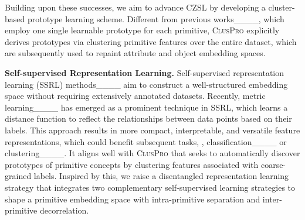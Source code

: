 Building upon these successes, we aim to advance CZSL by developing a cluster-based prototype learning scheme. 
Different from previous works____, which employ one single learnable prototype for each primitive, \textsc{ClusPro} explicitly derives prototypes via clustering primitive features over the entire dataset, which are subsequently used to repaint attribute and object embedding spaces.

\noindent\textbf{Self-supervised Representation Learning.} 
Self-supervised representation learning (SSRL) methods____ aim to construct a well-structured embedding space without requiring extensively annotated datasets.
Recently, metric learning____ has emerged as a prominent technique in SSRL, which learns a distance function to reflect the relationships between data points based on their labels.
This approach results in more compact, interpretable, and versatile feature representations, which could benefit subsequent tasks, \eg, classification____ or clustering____.
It aligns well with \textsc{ClusPro} that seeks to automatically discover prototypes of primitive concepts by clustering features associated with coarse-grained labels.
Inspired by this, we raise a disentangled representation learning strategy that integrates two complementary self-supervised learning strategies to shape a primitive embedding space with intra-primitive separation and inter-primitive decorrelation.